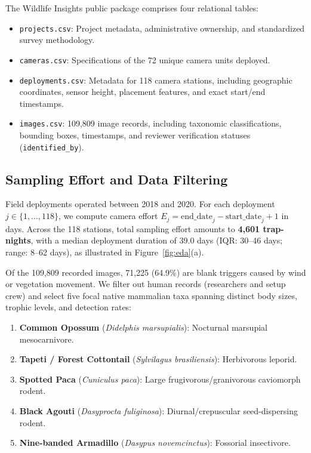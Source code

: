 \documentclass[11pt,a4paper]{article}
\begin{document}
The Wildlife Insights public package comprises four relational tables:
\begin{itemize}
    \item \texttt{projects.csv}: Project metadata, administrative ownership, and standardized survey methodology.
    \item \texttt{cameras.csv}: Specifications of the 72 unique camera units deployed.
    \item \texttt{deployments.csv}: Metadata for 118 camera stations, including geographic coordinates, sensor height, placement features, and exact start/end timestamps.
    \item \texttt{images.csv}: 109,809 image records, including taxonomic classifications, bounding boxes, timestamps, and reviewer verification statuses (\texttt{identified\_by}).
\end{itemize}

\subsection{Sampling Effort and Data Filtering}
Field deployments operated between 2018 and 2020. For each deployment $j \in \{1, \dots, 118\}$, we compute camera effort $E_j = \text{end\_date}_j - \text{start\_date}_j + 1$ in days. Across the 118 stations, total sampling effort amounts to \textbf{4,601 trap-nights}, with a median deployment duration of 39.0 days (IQR: 30--46 days; range: 8--62 days), as illustrated in Figure~\ref{fig:eda}(a).

Of the 109,809 recorded images, 71,225 (64.9\%) are blank triggers caused by wind or vegetation movement. We filter out human records (researchers and setup crew) and select five focal native mammalian taxa spanning distinct body sizes, trophic levels, and detection rates:
\begin{enumerate}
    \item \textbf{Common Opossum} (\textit{Didelphis marsupialis}): Nocturnal marsupial mesocarnivore.
    \item \textbf{Tapeti / Forest Cottontail} (\textit{Sylvilagus brasiliensis}): Herbivorous leporid.
    \item \textbf{Spotted Paca} (\textit{Cuniculus paca}): Large frugivorous/granivorous caviomorph rodent.
    \item \textbf{Black Agouti} (\textit{Dasyprocta fuliginosa}): Diurnal/crepuscular seed-dispersing rodent.
    \item \textbf{Nine-banded Armadillo} (\textit{Dasypus novemcinctus}): Fossorial insectivore.
\end{enumerate}
\end{document}
